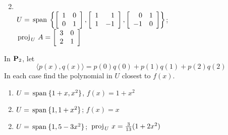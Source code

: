 \begin{multicols}{2}
\begin{ex}
\begin{enumerate}[label={\alph*.}]
\end{enumerate}
\begin{sol}
\begin{enumerate}[label={\alph*.}]
\setcounter{enumi}{1}
\item \hspace{1em} \\
\hspace*{-2em}$
U = \thinspace\operatorname{span\medspace} \left\{
\left[ \begin{array}{rr}
1 & 0 \\
0 & 1
\end{array} \right]
,
\left[ \begin{array}{rr}
1 & 1 \\
1 & -1
\end{array} \right]
,
\left[ \begin{array}{rr}
0 & 1 \\
-1 & 0
\end{array} \right]
\right\}$; \\ $\thinspace\operatorname{proj\medspace}_{\!U}\,{A} = 
\left[ \begin{array}{rr}
3 & 0 \\
2 & 1
\end{array} \right]$

\end{enumerate}
\end{sol}
\end{ex}

\begin{ex}
In $\textbf{P}_{2}$, let 
\begin{equation*}
\langle p(x), q(x)\rangle = p(0)q(0) + p(1)q(1) + p(2)q(2)
\end{equation*}
In each case find the polynomial in $U$ closest to $f(x)$.

\begin{enumerate}[label={\alph*.}]
\item $ U = \thinspace\operatorname{span\medspace}\{1 + x, x^2 \}$, $f(x) = 1 + x^2 $

\item $U = \thinspace\operatorname{span\medspace}\{1, 1 + x^2 \}$; $f(x) = x$

\end{enumerate}
\begin{sol}
\begin{enumerate}[label={\alph*.}]
\setcounter{enumi}{1}
\item  $ U = \thinspace\operatorname{span\medspace}\{1, 5 - 3x^2 \}$; $\thinspace\operatorname{proj\medspace}_{\!U}\,{x} = \tfrac{3}{13} (1 + 2x^2) $

\end{enumerate}
\end{sol}
\end{ex}


\end{multicols}
